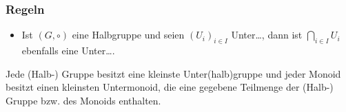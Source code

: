 \subsubsection{Regeln}
\begin{itemize}
	\item Ist $(G, \circ)$ eine Halbgruppe und seien $(U_i)_{i \in I}$ Unter\dots, dann ist $\bigcap_{i \in I} U_i$ ebenfalls eine Unter\dots.
\end{itemize}

Jede (Halb-) Gruppe besitzt eine kleinste Unter(halb)gruppe und jeder Monoid
besitzt einen kleinsten Untermonoid, die eine gegebene Teilmenge der (Halb-) Gruppe bzw.
des Monoids enthalten.
